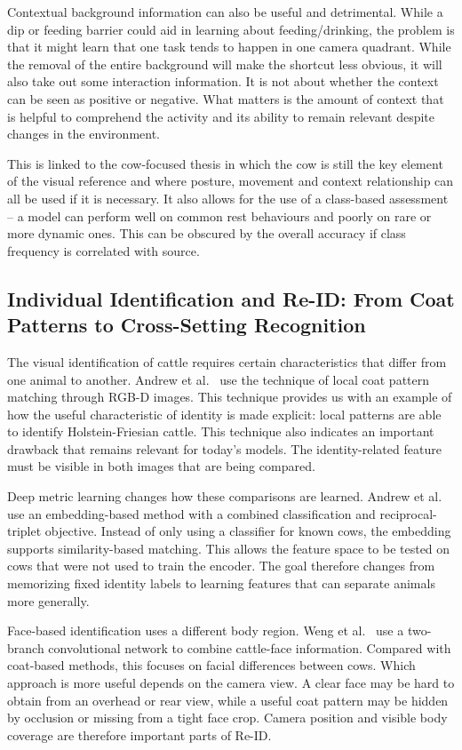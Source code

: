 Contextual background information can also be useful and detrimental. While a dip or feeding barrier could aid in learning about feeding/drinking, the problem is that it might learn that one task tends to happen in one camera quadrant. While the removal of the entire background will make the shortcut less obvious, it will also take out some interaction information. It is not about whether the context can be seen as positive or negative. What matters is the amount of context that is helpful to comprehend the activity and its ability to remain relevant despite changes in the environment.

This is linked to the cow-focused thesis in which the cow is still the key element of the visual reference and where posture, movement and context relationship can all be used if it is necessary. It also allows for the use of a class-based assessment – a model can perform well on common rest behaviours and poorly on rare or more dynamic ones. This can be obscured by the overall accuracy if class frequency is correlated with source.

\subsection{Individual Identification and Re-ID: From Coat Patterns to Cross-Setting Recognition}

The visual identification of cattle requires certain characteristics that differ from one animal to another. Andrew et al.~\cite{andrew2017cattle} use the technique of local coat pattern matching through RGB-D images. This technique provides us with an example of how the useful characteristic of identity is made explicit: local patterns are able to identify Holstein-Friesian cattle. This technique also indicates an important drawback that remains relevant for today's models. The identity-related feature must be visible in both images that are being compared.

Deep metric learning changes how these comparisons are learned. Andrew et al.~\cite{andrew2021opencows} use an embedding-based method with a combined classification and reciprocal-triplet objective. Instead of only using a classifier for known cows, the embedding supports similarity-based matching. This allows the feature space to be tested on cows that were not used to train the encoder. The goal therefore changes from memorizing fixed identity labels to learning features that can separate animals more generally.

Face-based identification uses a different body region. Weng et al.~\cite{weng2022cattleface} use a two-branch convolutional network to combine cattle-face information. Compared with coat-based methods, this focuses on facial differences between cows. Which approach is more useful depends on the camera view. A clear face may be hard to obtain from an overhead or rear view, while a useful coat pattern may be hidden by occlusion or missing from a tight face crop. Camera position and visible body coverage are therefore important parts of Re-ID.

